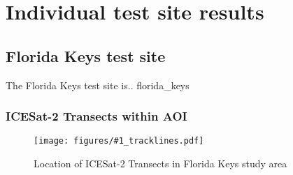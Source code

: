\newcommand{\sitesummary}[2]{

\section{#2 test site}

The #2 test site is.. #1


\subsection{ICESat-2 Transects within AOI}
\begin{figure}[h]
    \centering
    \texttt{[image: figures/\#1\_tracklines.pdf]}
    \caption{Location of ICESat-2 Transects in #2 study area}
    \label{fig:#1_transects}
\end{figure}





% 
}

\chapter{Individual test site results}

\sitesummary{florida\_keys}{Florida Keys}